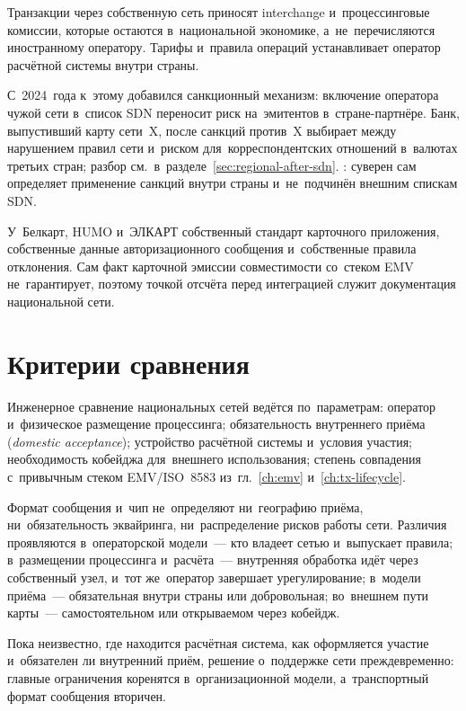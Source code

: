 Транзакции через собственную сеть приносят interchange и~процессинговые
комиссии, которые остаются в~национальной экономике, а~не~перечисляются
иностранному оператору. Тарифы и~правила операций устанавливает оператор
расчётной системы внутри страны.

С~2024~года к~этому добавился санкционный механизм: включение оператора чужой
сети в~список SDN переносит риск на~эмитентов в~стране-партнёре. Банк, выпустивший карту
сети~X, после санкций против~X выбирает между нарушением правил сети и~риском
для~корреспондентских отношений в~валютах третьих стран; разбор
см.~в~разделе~\ref{sec:regional-after-sdn}. : суверен сам определяет применение
санкций внутри страны и~не~подчинён внешним спискам SDN.

У~Белкарт, HUMO и~ЭЛКАРТ собственный стандарт карточного приложения,
собственные данные авторизационного сообщения и~собственные правила отклонения.
Сам факт карточной эмиссии совместимости со~стеком EMV не~гарантирует,
поэтому точкой отсчёта перед интеграцией служит документация национальной сети.

\section{Критерии сравнения}\label{sec:regional-framework}

Инженерное сравнение национальных сетей ведётся по~параметрам: оператор
и~физическое размещение процессинга; обязательность внутреннего приёма
(\textit{domestic acceptance}); устройство расчётной системы и~условия участия;
необходимость кобейджа для~внешнего использования; степень совпадения
с~привычным стеком EMV/ISO~8583 из~гл.~\ref{ch:emv} и~\ref{ch:tx-lifecycle}.

Формат сообщения и~чип не~определяют ни~географию приёма, ни~обязательность
эквайринга, ни~распределение рисков работы сети. Различия проявляются
в~операторской модели~--- кто владеет сетью и~выпускает правила; в~размещении
процессинга и~расчёта~--- внутренняя обработка идёт через собственный узел,
и~тот же~оператор завершает урегулирование; в~модели приёма~--- обязательная
внутри страны или добровольная; во~внешнем пути карты~--- самостоятельном или
открываемом через кобейдж.

Пока неизвестно, где находится расчётная система, как оформляется участие
и~обязателен ли внутренний приём, решение о~поддержке сети преждевременно:
главные ограничения коренятся в~организационной модели, а~транспортный формат
сообщения вторичен.


